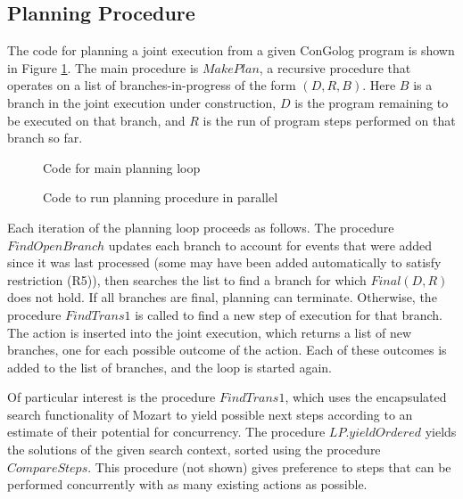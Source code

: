 \subsection{Planning Procedure}

The code for planning a joint execution from a given ConGolog program
is shown in Figure \ref{fig:planning-code}. The main procedure is
$MakePlan$, a recursive procedure that operates on a list of branches-in-progress
of the form $(D,R,B)$. Here $B$ is a branch in the joint execution
under construction, $D$ is the program remaining to be executed on
that branch, and $R$ is the run of program steps performed on that
branch so far.

%
\begin{figure}

\caption{ Code for main planning loop }


\label{fig:planning-code} 
\end{figure}


%
\begin{figure}

\caption{ Code to run planning procedure in parallel }


\label{fig:parallel-search} 
\end{figure}


Each iteration of the planning loop proceeds as follows. The procedure
$FindOpenBranch$ updates each branch to account for events that were
added since it was last processed (some may have been added automatically
to satisfy restriction (R5)), then searches the list to find a branch
for which $Final(D,R)$ does not hold. If all branches are final,
planning can terminate. Otherwise, the procedure $FindTrans1$ is
called to find a new step of execution for that branch. The action
is inserted into the joint execution, which returns a list of new
branches, one for each possible outcome of the action. Each of these
outcomes is added to the list of branches, and the loop is started
again.

Of particular interest is the procedure $FindTrans1$, which uses
the encapsulated search functionality of Mozart to yield possible
next steps according to an estimate of their potential for concurrency.
The procedure $LP.yieldOrdered$ yields the solutions of the given
search context, sorted using the procedure $CompareSteps$. This procedure
(not shown) gives preference to steps that can be performed concurrently
with as many existing actions as possible.


